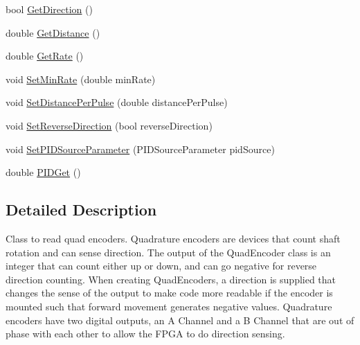 \begin{DoxyCompactItemize}
\item 
bool \hyperlink{classEncoder_a135a248f9e69f99baa7c4ab8eaf66eb2}{\-Get\-Direction} ()
\item 
double \hyperlink{classEncoder_a523cc5a0cbd52f937f2a25a14185bc22}{\-Get\-Distance} ()
\item 
double \hyperlink{classEncoder_a72423acddb85ee347fc213b8600843f7}{\-Get\-Rate} ()
\item 
void \hyperlink{classEncoder_aed57d1224b55a28c666f2888102efbec}{\-Set\-Min\-Rate} (double min\-Rate)
\item 
void \hyperlink{classEncoder_a0bfacc84063e402077f1f620ea863ce5}{\-Set\-Distance\-Per\-Pulse} (double distance\-Per\-Pulse)
\item 
void \hyperlink{classEncoder_aefeeb7018f6f8ee57d824577c1c31f42}{\-Set\-Reverse\-Direction} (bool reverse\-Direction)
\item 
void \hyperlink{classEncoder_a1254bae484d9ac5d794c760d097e10b9}{\-Set\-P\-I\-D\-Source\-Parameter} (\-P\-I\-D\-Source\-Parameter pid\-Source)
\item 
double \hyperlink{classEncoder_a08665d9e47c9fa77606dfe8611612e73}{\-P\-I\-D\-Get} ()
\end{DoxyCompactItemize}


\subsection{\-Detailed \-Description}
\-Class to read quad encoders. \-Quadrature encoders are devices that count shaft rotation and can sense direction. \-The output of the \-Quad\-Encoder class is an integer that can count either up or down, and can go negative for reverse direction counting. \-When creating \-Quad\-Encoders, a direction is supplied that changes the sense of the output to make code more readable if the encoder is mounted such that forward movement generates negative values. \-Quadrature encoders have two digital outputs, an \-A \-Channel and a \-B \-Channel that are out of phase with each other to allow the \-F\-P\-G\-A to do direction sensing. 

